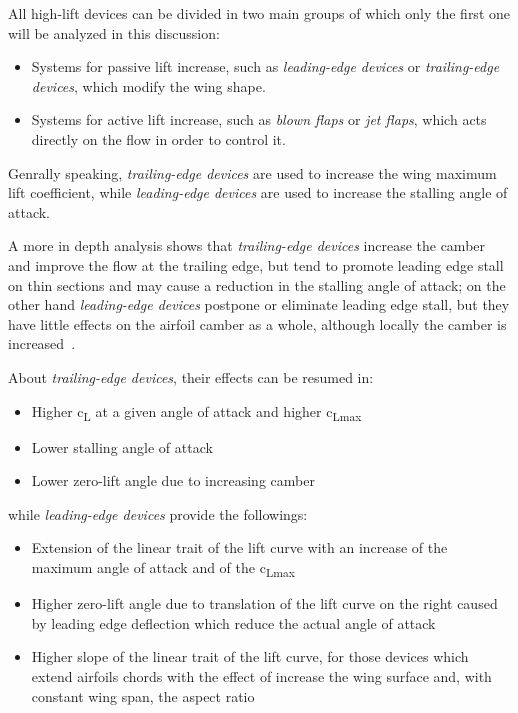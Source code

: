 \bigskip
\noindent
All high-lift devices can be divided in two main groups of which only the first one will be analyzed in this discussion:

\begin{itemize}
\item Systems for passive lift increase, such as \emph{leading-edge devices} or \emph{trailing-edge devices}, which modify the wing shape.
\item Systems for active lift increase, such as \emph{blown flaps} or \emph{jet flaps}, which acts directly on the flow in order to control it.
\end{itemize}

\noindent
Genrally speaking, \emph{trailing-edge devices} are used to increase the wing maximum lift coefficient, while \emph{leading-edge devices} are used to increase the stalling angle of attack. 

A more in depth analysis shows that \emph{trailing-edge devices} increase the camber and improve the flow at the trailing edge, but tend to promote leading edge stall on thin sections and may cause a reduction in the stalling angle of attack; on the other hand \emph{leading-edge devices} postpone or eliminate leading edge stall, but  they have little effects on the airfoil camber as a whole, although locally the camber is increased~\cite{torenbeek1982synthesis}.

\bigskip
\noindent
About \emph{trailing-edge devices}, their effects can be resumed in:

\begin{itemize}
\item Higher c\textsubscript{L} at a given angle of attack and higher c\textsubscript{Lmax}
\item Lower stalling angle of attack
\item Lower zero-lift angle due to increasing camber
\end{itemize}

\noindent
while \emph{leading-edge devices} provide the followings:
\begin{itemize}
\item Extension of the linear trait of the lift curve with an increase of the maximum angle of attack and of the c\textsubscript{Lmax}
\item Higher zero-lift angle due to translation of the lift curve on the right caused by leading edge deflection which reduce the actual angle of attack 
\item Higher slope of the linear trait of the lift curve, for those devices which extend airfoils chords with the effect of increase the wing surface and, with constant wing span, the aspect ratio
\end{itemize}

